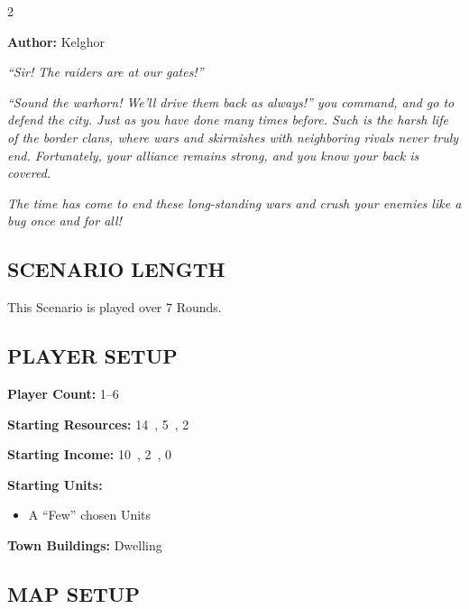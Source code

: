 
\begin{multicols}{2}

\textbf{Author:} Kelghor

\textit{``Sir! The raiders are at our gates!''}

\textit{``Sound the warhorn! We'll drive them back as always!'' you command, and go to defend the city. Just as you have done many times before. Such is the harsh life of the border clans, where wars and skirmishes with neighboring rivals never truly end. Fortunately, your alliance remains strong, and you know your back is covered.}

\textit{The time has come to end these long-standing wars and crush your enemies like a bug once and for all!}

\subsection*{\MakeUppercase{Scenario Length}}

This Scenario is played over 7 Rounds.

\subsection*{\MakeUppercase{Player Setup}}

\textbf{Player Count:} 1--6

\textbf{Starting Resources:} 14~, 5~, 2~

\textbf{Starting Income:} 10~, 2~, 0~

\textbf{Starting Units:}
\begin{itemize}
  \item A ``Few'' chosen  Units
\end{itemize}

\textbf{Town Buildings:}  Dwelling

\subsection*{\MakeUppercase{Map Setup}}


\end{multicols}
